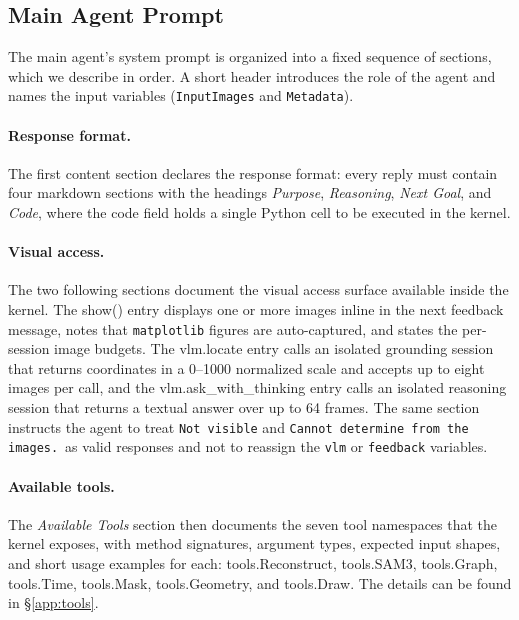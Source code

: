 \documentclass{llmxive}
\providecommand{\apicode}[1]{#1}
\begin{document}
\subsection{Main Agent Prompt}
\label{app:prompt_main}
The main agent's system prompt is organized into a fixed sequence of sections, which we describe in order. A short header introduces the role of the agent and names the input variables (\texttt{InputImages} and \texttt{Metadata}).

\paragraph{Response format.}
The first content section declares the response format: every reply must contain four markdown sections with the headings \emph{Purpose}, \emph{Reasoning}, \emph{Next Goal}, and \emph{Code}, where the code field holds a single Python cell to be executed in the kernel.

\paragraph{Visual access.}
The two following sections document the visual access surface available inside the kernel. The \apicode{show()} entry displays one or more images inline in the next feedback message, notes that \texttt{matplotlib} figures are auto-captured, and states the per-session image budgets. The \apicode{vlm.locate} entry calls an isolated grounding session that returns coordinates in a 0--1000 normalized scale and accepts up to eight images per call, and the \apicode{vlm.ask_with_thinking} entry calls an isolated reasoning session that returns a textual answer over up to 64 frames. The same section instructs the agent to treat \texttt{Not visible} and \texttt{Cannot determine from the images.}\ as valid responses and not to reassign the \texttt{vlm} or \texttt{feedback} variables.

\paragraph{Available tools.}
The \emph{Available Tools} section then documents the seven tool namespaces that the kernel exposes, with method signatures, argument types, expected input shapes, and short usage examples for each: \apicode{tools.Reconstruct}, \apicode{tools.SAM3}, \apicode{tools.Graph}, \apicode{tools.Time}, \apicode{tools.Mask}, \apicode{tools.Geometry}, and \apicode{tools.Draw}. The details can be found in \S\ref{app:tools}.
\end{document}
